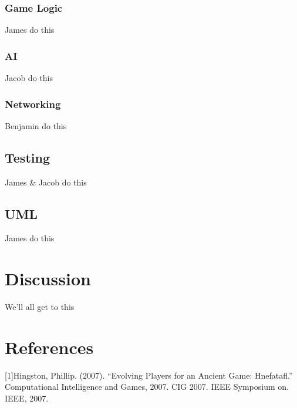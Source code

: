 \documentclass{article}
\begin{document}
\subsubsection{Game Logic}
James do this

\subsubsection{AI}
Jacob do this

\subsubsection{Networking}
Benjamin do this

\subsection{Testing}
James \& Jacob do this

\subsection{UML}
James do this

\section{Discussion}
We'll all get to this

\section{References}
[1]Hingston, Phillip. (2007). “Evolving Players for an Ancient Game: Hnefatafl.” Computational Intelligence and Games, 2007. CIG 2007. IEEE Symposium on. IEEE, 2007.
\end{document}

